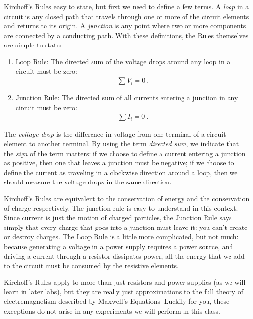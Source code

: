 \documentclass[12pt]{article}
\begin{document}
Kirchoff's Rules easy to state, but first we need to define a few
terms.  A \textit{loop} in a circuit is any closed path that travels
through one or more of the circuit elements and returns to its origin.
A \textit{junction} is any point where two or more components are
connected by a conducting path.  With these definitions, the Rules
themselves are simple to state:
\begin{enumerate}
\item Loop Rule: The directed sum of the voltage drops around any loop
  in a circuit must be zero:
  \begin{gather*}
    \sum V_i = 0\ .
  \end{gather*}
\item Junction Rule: The directed sum of all currents entering a
  junction in any circuit must be zero:
  \begin{gather*}
    \sum I_i = 0\ .
  \end{gather*}
\end{enumerate}
The \textit{voltage drop} is the difference in voltage from one
terminal of a circuit element to another terminal.  By using the term
\textit{directed sum}, we indicate that the \textit{sign} of the term
matters: if we choose to define a current entering a junction as
positive, then one that leaves a junction must be negative; if we
choose to define the current as traveling in a clockwise direction
around a loop, then we should measure the voltage drops in the same
direction.

Kirchoff's Rules are equivalent to the conservation of energy and the
conservation of charge respectively.  The junction rule is easy to
understand in this context.  Since current is just the motion of
charged particles, the Junction Rule says simply that every charge
that goes into a junction must leave it: you can't create or destroy
charges.  The Loop Rule is a little more complicated, but not much:
because generating a voltage in a power supply requires a power
source, and driving a current through a resistor dissipates power, all
the energy that we add to the circuit must be consumed by the
resistive elements.

Kirchoff's Rules apply to more than just resistors and power supplies
(as we will learn in later labs), but they are really just
approximations to the full theory of electromagnetism described by
Maxwell's Equations.  Luckily for you, these exceptions do not arise
in any experiments we will perform in this class.
\end{document}
